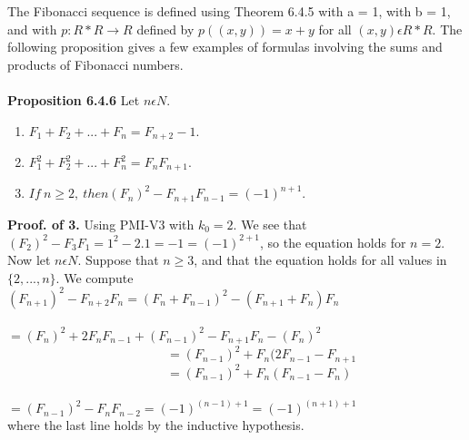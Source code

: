 \documentclass[a4paper,english,12pt]{article}
\begin{document}
The Fibonacci sequence is defined using Theorem 6.4.5 with a = 1, with b = 1, and with $p:R*R\rightarrow R$ defined by $p((x,y))=x+y$ for all $(x,y)\epsilon R*R$. The following proposition gives a few examples of formulas involving the sums and products of Fibonacci numbers.
\\ \\ 
{\bf Proposition 6.4.6} Let $n\epsilon N$.
\begin{enumerate}
\item $F_1 + F_2 + . . . + F_n = F_{n+2} − 1$.
\item $F_1^2 + F_2^2 + . . . + F_n^2 = F_nF_{n+1}$.
\item $ If~ n\geq2,~ then (F_n)^2 − F_{n+1}F_{n−1}=(−1)^{n+1}$.
\end{enumerate}
{\bf Proof. of 3.} Using PMI-V3 with $k_0=2$. We see that $(F_2)^2-F_3F_1=1^2-2.1=-1=(-1)^{2+1}$, so the equation holds for $n=2$. Now let $n\epsilon N$. Suppose that $n\geq3$, and that the equation holds for all values in $\{2, . . ., n\}$. We compute \\
$(F_{n+1})^2 - F_{n+2}F_n=(F_n+F_{n-1})^2 - (F_{n+1}+F_n)F_n$\\
~~~~~~~~~~~~~~~~~~~~~~~~~$=(F_n)^2+2F_nF_{n-1}+(F_{n-1})^2-F_{n+1}F_n-(F_n)^2$\\
~~~~~~~~~~~~~~~~~~~~~~~~~$=(F_{n-1})^2+F_n(2F_{n-1}-F_{n+1}$\\
~~~~~~~~~~~~~~~~~~~~~~~~~$=(F_{n-1})^2+F_n(F_{n-1}-F_n)$\\
~~~~~~~~~~~~~~~~~~~~~~~~~$=(F_{n-1})^2-F_nF_{n-2}=(-1)^{(n-1)+1}=(-1)^{(n+1)+1}$ \\where the last line holds by the inductive hypothesis.
\end{document}
